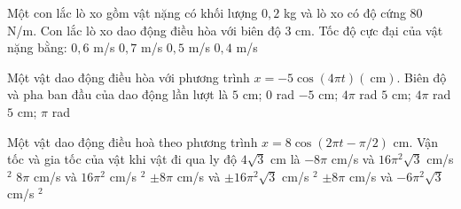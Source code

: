 \begin{ex}
Một con lắc lò xo gồm vật nặng có khối lượng $0{,}2$ kg và lò xo có độ cứng $80$ N/m. Con lắc lò xo dao động điều hòa với biên độ $3$ cm. Tốc độ cực đại của vật nặng bằng:
\choice
{\True $0{,}6$ m/s}
{$0{,}7$ m/s}
{$0{,}5$ m/s}
{$0{,}4$ m/s}
\end{ex}

\begin{ex}
Một vật dao động điều hòa với phương trình $x=-5\cos(4\pi t)(\mathrm{~cm})$. Biên độ và pha ban đầu của dao động lần lượt là
\choice
{$5$ cm; $0$ rad}
{$-5$ cm; $4\pi$ rad}
{$5$ cm; $4\pi$ rad}
{\True $5$ cm; $\pi$ rad}
\end{ex}

\begin{ex}
Một vật dao động điều hoà theo phương trình $x=8\cos(2\pi t - \pi/2)$ cm. Vận tốc và gia tốc của vật khi vật đi qua ly độ $4\sqrt{3}$ cm là
\choice
{$-8\pi$ cm/s và $16\pi^2\sqrt{3}$ cm/s $^2$}
{$8\pi$ cm/s và $16\pi^2$ cm/s $^2$}
{$\pm 8\pi$ cm/s và $\pm 16\pi^2\sqrt{3}$ cm/s $^2$}
{\True $\pm 8\pi$ cm/s và $-6\pi^2\sqrt{3}$ cm/s $^2$}
\end{ex}
